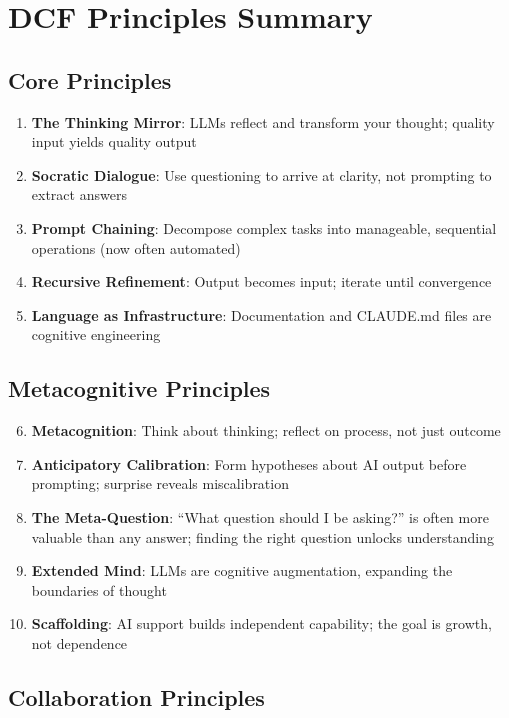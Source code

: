 \chapter{DCF Principles Summary}

\section{Core Principles}

\begin{enumerate}
    \item \textbf{The Thinking Mirror}: LLMs reflect and transform your thought; quality input yields quality output
    \item \textbf{Socratic Dialogue}: Use questioning to arrive at clarity, not prompting to extract answers
    \item \textbf{Prompt Chaining}: Decompose complex tasks into manageable, sequential operations (now often automated)
    \item \textbf{Recursive Refinement}: Output becomes input; iterate until convergence
    \item \textbf{Language as Infrastructure}: Documentation and CLAUDE.md files are cognitive engineering
\end{enumerate}

\section{Metacognitive Principles}

\begin{enumerate}
    \setcounter{enumi}{5}
    \item \textbf{Metacognition}: Think about thinking; reflect on process, not just outcome
    \item \textbf{Anticipatory Calibration}: Form hypotheses about AI output before prompting; surprise reveals miscalibration
    \item \textbf{The Meta-Question}: ``What question should I be asking?'' is often more valuable than any answer; finding the right question unlocks understanding
    \item \textbf{Extended Mind}: LLMs are cognitive augmentation, expanding the boundaries of thought
    \item \textbf{Scaffolding}: AI support builds independent capability; the goal is growth, not dependence
\end{enumerate}

\section{Collaboration Principles}

